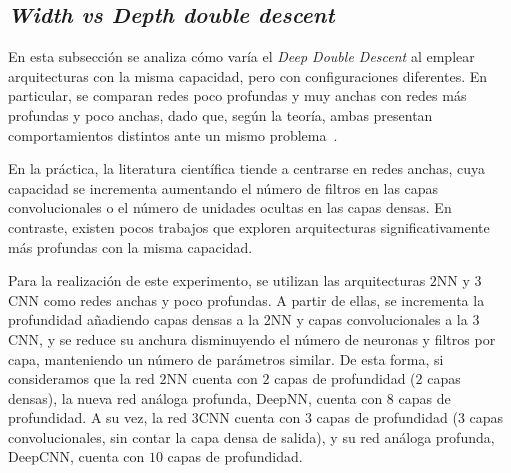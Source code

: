 \subsection{\textit{Width vs Depth double descent}}\label{subsec:width-depth}

En esta subsección se analiza cómo varía el \textit{Deep Double Descent} al emplear arquitecturas con la misma capacidad, pero con configuraciones diferentes. En particular, se comparan redes poco profundas y muy anchas con redes más profundas y poco anchas, dado que, según la teoría, ambas presentan comportamientos distintos ante un mismo problema~\cite{Nguyen2021}.

En la práctica, la literatura científica tiende a centrarse en redes anchas, cuya capacidad se incrementa aumentando el número de filtros en las capas convolucionales o el número de unidades ocultas en las capas densas. En contraste, existen pocos trabajos que exploren arquitecturas significativamente más profundas con la misma capacidad.

Para la realización de este experimento, se utilizan las arquitecturas $2$NN y $3$CNN como redes anchas y poco profundas. A partir de ellas, se incrementa la profundidad añadiendo capas densas a la $2$NN y capas convolucionales a la $3$CNN, y se reduce su anchura disminuyendo el número de neuronas y filtros por capa, manteniendo un número de parámetros similar. De esta forma, si consideramos que la red $2$NN cuenta con $2$ capas de profundidad ($2$ capas densas), la nueva red análoga profunda, DeepNN, cuenta con $8$ capas de profundidad. A su vez, la red $3$CNN cuenta con $3$ capas de profundidad ($3$ capas convolucionales, sin contar la capa densa de salida), y su red análoga profunda, DeepCNN, cuenta con $10$ capas de profundidad.


